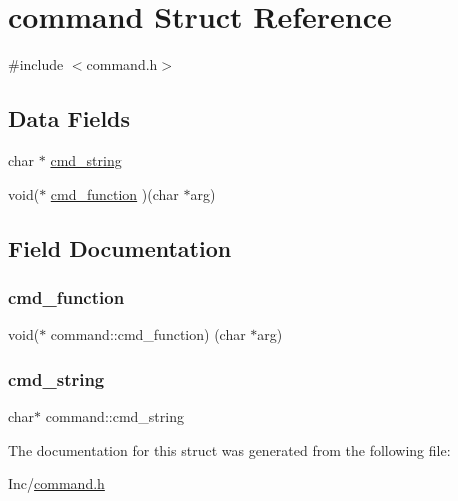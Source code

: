 \hypertarget{structcommand}{}\section{command Struct Reference}
\label{structcommand}


{\ttfamily \#include $<$command.\+h$>$}

\subsection*{Data Fields}
\begin{DoxyCompactItemize}
\item 
char $\ast$ \hyperlink{structcommand_a4d92aff9772b6ef2e655cdeffd189fed}{cmd\+\_\+string}
\item 
void($\ast$ \hyperlink{structcommand_af1afdea144bf74ff8f81a0e3efab9218}{cmd\+\_\+function} )(char $\ast$arg)
\end{DoxyCompactItemize}


\subsection{Field Documentation}
\mbox{\label{structcommand_af1afdea144bf74ff8f81a0e3efab9218}} 
\subsubsection{\texorpdfstring{cmd\+\_\+function}{cmd\_function}}
{\footnotesize\ttfamily void($\ast$ command\+::cmd\+\_\+function) (char $\ast$arg)}

\mbox{\label{structcommand_a4d92aff9772b6ef2e655cdeffd189fed}} 
\subsubsection{\texorpdfstring{cmd\+\_\+string}{cmd\_string}}
{\footnotesize\ttfamily char$\ast$ command\+::cmd\+\_\+string}



The documentation for this struct was generated from the following file\+:\begin{DoxyCompactItemize}
\item 
Inc/\hyperlink{command_8h}{command.\+h}\end{DoxyCompactItemize}
